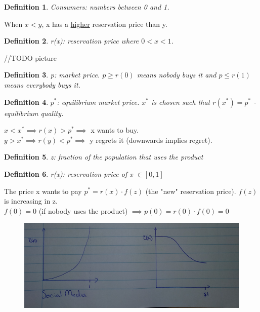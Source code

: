 \documentclass[12pt]{scrartcl}
\newtheorem{defi}{Definition}
\begin{document}
\begin{defi}
	Consumers: numbers between 0 and 1.
\end{defi}

When $x < y$, x has a \underline{higher} reservation price than y.
\begin{defi}
	r(x): reservation price where $0 < x < 1$.
\end{defi}
//TODO picture

\begin{defi}
	p: market price. $p \geq r(0)$ means nobody buys it and $p \leq r(1)$ means everybody buys it.
\end{defi}

\begin{defi}
	$p^{*}$: equilibrium market price. $x^{*}$ is chosen such that $r(x^{*}) = p^{*}$ - equilibrium quality.
\end{defi}

\noindent $x < x^{*} \implies r(x) > p^{*} \implies$ x wants to buy.\\
$y > x^{*} \implies r(y) < p^{*} \implies$ y regrets it (downwards implies regret).\\

\begin{defi}
	z: fraction of the population that uses the product
\end{defi}
\begin{defi}
	r(x): reservation price of x $\in [0,1]$
\end{defi}
\noindent The price  x wants to pay $p^{*} = r(x)\cdot f(z)$ (the "new" reservation price). $f(z)$ is increasing in z.\\
$f(0) = 0$ (if nobody uses the product) $\implies p(0) = r(0)\cdot f(0) = 0$

\begin{figure}[h]
	\centering
	\includegraphics[width=1\textwidth]{./images/graph_social_media.png}
\end{figure}
\end{document}
